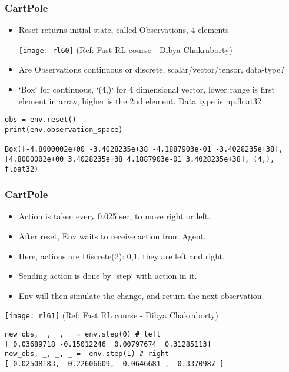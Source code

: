 \begin{frame}[fragile]\frametitle{CartPole}

\begin{itemize}
\item Reset returns initial state, called Observations, 4 elements

\begin{center}
\texttt{[image: rl60]}
{\tiny (Ref: Fast RL course - Dibya Chakraborty)}
\end{center}

\item Are Observations continuous or discrete, scalar/vector/tensor, data-type?
\item `Box` for continuous, `(4,)` for 4 dimensional vector, lower range is first element in array, higher is the 2nd element. Data type is np.float32
\end{itemize}

\begin{lstlisting}
obs = env.reset() 
print(env.observation_space)

Box([-4.8000002e+00 -3.4028235e+38 -4.1887903e-01 -3.4028235e+38], [4.8000002e+00 3.4028235e+38 4.1887903e-01 3.4028235e+38], (4,), float32)
\end{lstlisting}


\end{frame}

\begin{frame}[fragile]\frametitle{CartPole}

\begin{itemize}
\item Action is taken every 0.025 sec, to move right or left.
\item After reset, Env waits to receive action from Agent.
\item Here, actions are Discrete(2): 0,1, they are left and right.
\item Sending action is done by `step` with action in it.
\item Env will then simulate the change, and return the next observation.
\end{itemize}

\begin{center}
\texttt{[image: rl61]}
{\tiny (Ref: Fast RL course - Dibya Chakraborty)}
\end{center}

\begin{lstlisting}
new_obs, _, _, _ = env.step(0) # left
[ 0.03689718 -0.15012246  0.00797674  0.31285113]
new_obs, _, _, _ =  env.step(1) # right
[-0.02508183, -0.22606609,  0.0646681 ,  0.3370987 ]
\end{lstlisting}


\end{frame}

